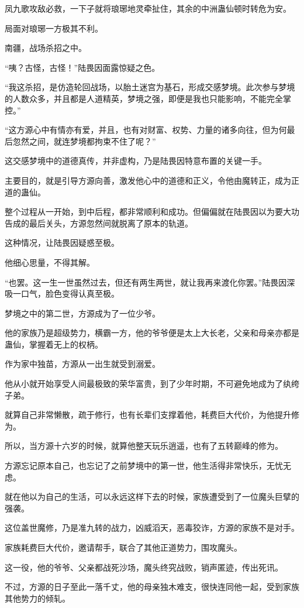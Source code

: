 \begin{this_body}
凤九歌攻敌必救，一下子就将琅琊地灵牵扯住，其余的中洲蛊仙顿时转危为安。

局面对琅琊一方极其不利。

南疆，战场杀招之中。

“咦？古怪，古怪！”陆畏因面露惊疑之色。

“我这杀招，是仿造轮回战场，以胎土迷宫为基石，形成交感梦境。此次参与梦境的人数众多，并且都是人道精英，梦境之强，即便是我也只能影响，不能完全掌控。”

“这方源心中有情亦有爱，并且，也有对财富、权势、力量的诸多向往，但为何最后忽然之间，就连梦境都拘束不住了呢？”

这交感梦境中的道德真传，并非虚构，乃是陆畏因特意布置的关键一手。

主要目的，就是引导方源向善，激发他心中的道德和正义，令他由魔转正，成为正道的蛊仙。

整个过程从一开始，到中后程，都非常顺利和成功。但偏偏就在陆畏因以为要大功告成的最后关头，方源忽然间就脱离了原本的轨道。

这种情况，让陆畏因疑惑至极。

他细心思量，不得其解。

“也罢。这一生一世虽然过去，但还有两生两世，就让我再来渡化你罢。”陆畏因深吸一口气，脸色变得认真至极。

梦境之中的第二世，方源成为了一位少爷。

他的家族乃是超级势力，横霸一方，他的爷爷便是太上大长老，父亲和母亲亦都是蛊仙，掌握着无上的权柄。

作为家中独苗，方源从一出生就受到溺爱。

他从小就开始享受人间最极致的荣华富贵，到了少年时期，不可避免地成为了纨绔子弟。

就算自己非常懒散，疏于修行，也有长辈们支撑着他，耗费巨大代价，为他提升修为。

所以，当方源十六岁的时候，就算他整天玩乐逍遥，也有了五转巅峰的修为。

方源忘记原本自己，也忘记了之前梦境中的第一世，他生活得非常快乐，无忧无虑。

就在他以为自己的生活，可以永远这样下去的时候，家族遭受到了一位魔头巨擘的强袭。

这位盖世魔修，乃是准九转的战力，凶威滔天，恶毒狡诈，方源的家族不是对手。

家族耗费巨大代价，邀请帮手，联合了其他正道势力，围攻魔头。

这一役，他的爷爷、父亲都战死沙场，魔头终究战败，销声匿迹，传出死讯。

不过，方源的日子至此一落千丈，他的母亲独木难支，很快连同他一起，受到家族其他势力的倾轧。


\end{this_body}
